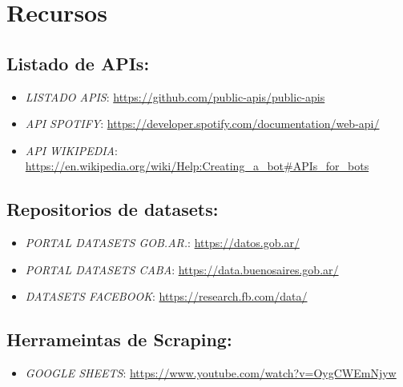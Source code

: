 \documentclass[
]{book}
\providecommand{\tightlist}{%
  \setlength{\itemsep}{0pt}\setlength{\parskip}{0pt}}
\begin{document}
\hypertarget{recursos}{%
\section{Recursos}\label{recursos}}

\hypertarget{listado-de-apis}{%
\subsection{Listado de APIs:}\label{listado-de-apis}}

\begin{itemize}
\tightlist
\item
  \emph{LISTADO APIS}: \url{https://github.com/public-apis/public-apis}
\item
  \emph{API SPOTIFY}: \url{https://developer.spotify.com/documentation/web-api/}
\item
  \emph{API WIKIPEDIA}: \url{https://en.wikipedia.org/wiki/Help:Creating_a_bot\#APIs_for_bots}
\end{itemize}

\hypertarget{repositorios-de-datasets}{%
\subsection{Repositorios de datasets:}\label{repositorios-de-datasets}}

\begin{itemize}
\tightlist
\item
  \emph{PORTAL DATASETS GOB.AR.}: \url{https://datos.gob.ar/}
\item
  \emph{PORTAL DATASETS CABA}: \url{https://data.buenosaires.gob.ar/}
\item
  \emph{DATASETS FACEBOOK}: \url{https://research.fb.com/data/}
\end{itemize}

\hypertarget{herrameintas-de-scraping}{%
\subsection{Herrameintas de Scraping:}\label{herrameintas-de-scraping}}

\begin{itemize}
\tightlist
\item
  \emph{GOOGLE SHEETS}: \url{https://www.youtube.com/watch?v=OygCWEmNjyw}
\end{itemize}
\end{document}
